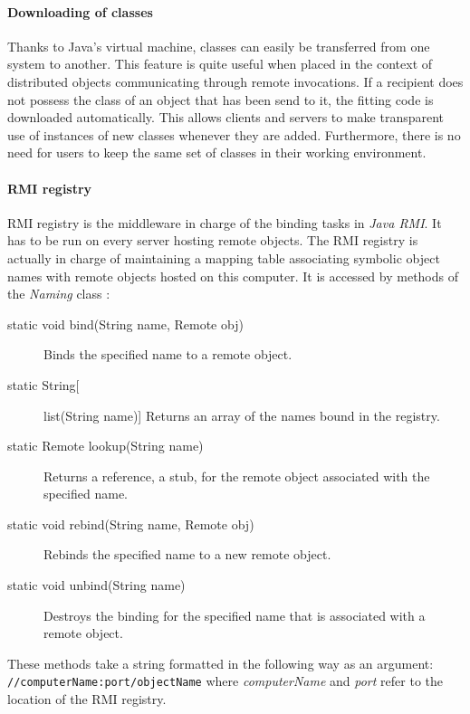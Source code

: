 \paragraph{Downloading of classes}

Thanks to Java's virtual machine, classes can easily be transferred from one system to another. This feature is quite useful when placed in the context of distributed objects communicating through remote invocations. If a recipient does not possess the class of an object that has been send to it, the fitting code is downloaded automatically. This allows clients and servers to make transparent use of instances of new classes whenever they are added. Furthermore, there is no need for users to keep the same set of classes in their working environment.

\paragraph{RMI registry}

RMI registry is the middleware in charge of the binding tasks in \textit{Java RMI}. It has to be run on every server hosting remote objects. The RMI registry is actually in charge of maintaining a mapping table associating symbolic object names with remote objects hosted on this computer. It is accessed by methods of the \textit{Naming} class :
\begin{description}
\item[static void 	bind(String name, Remote obj)]
    Binds the specified name to a remote object.
\item[static String[] 	list(String name)]
    Returns an array of the names bound in the registry.
\item[static Remote 	lookup(String name)]
    Returns a reference, a stub, for the remote object associated with the specified name.
\item[static void 	rebind(String name, Remote obj)]
    Rebinds the specified name to a new remote object.
\item[static void 	unbind(String name)]
    Destroys the binding for the specified name that is associated with a remote object.
\end{description}
These methods take a string formatted in the following way as an argument:
\verb|//computerName:port/objectName|
where \textit{computerName} and \textit{port} refer to the location of the RMI registry.
\cite{DS-book}


